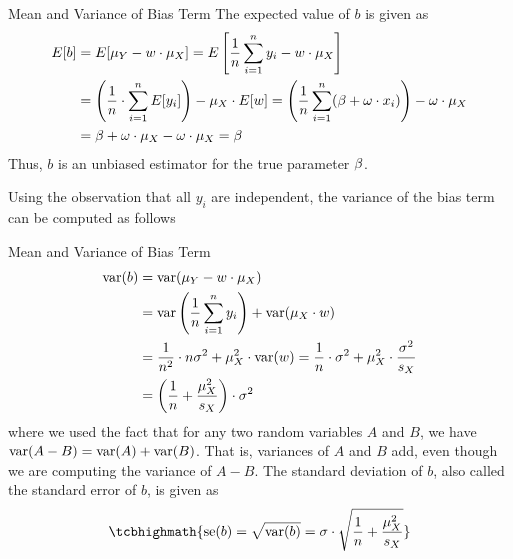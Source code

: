 \begin{frame}{Mean and Variance of Bias Term}
The expected value of $b$ is given as
\begin{align*}
    E[b] & = E[ \mu_Y - w \cdot \mu_X]
    = E\left[ \frac{1}{n} \sum^{n}_{i=1} y_i - w \cdot \mu_X \right]\\
    & = \left(\frac{1}{n} \cdot \sum_{i=1}^n E[ y_{i} ]\right) - \mu_X \cdot E[w]
    = \left(\frac{1}{n} \sum^{n}_{i=1} (\beta + \omega \cdot x_i)\right) 
    - \omega \cdot \mu_X\\
    & = \beta + \omega \cdot \mu_X - \omega \cdot \mu_X = \beta
\end{align*}
Thus, $b$ is an unbiased estimator for the true parameter $\beta$.

Using the observation that all $y_i$ are independent, 
the variance of the bias term can be computed as follows
\end{frame}
%
\begin{frame}{Mean and Variance of Bias Term}
\begin{align*}
    \operatorname{var}(b) & = \operatorname{var}(\mu_Y - w \cdot \mu_X)\\
    & = \operatorname{var}\left( \frac{1}{n} \sum^{n}_{i=1} y_i \right) +
    \operatorname{var}(\mu_X \cdot w)\\
   &  = \frac{1}{n^2} \cdot n \sigma^2 + \mu_X^2 \cdot \operatorname{var}(w)
    = \frac{1}{n} \cdot \sigma^2 + \mu_X^2 \cdot \frac{\sigma^2}{s_X}\\
  & = \left(\frac{1}{n} + \frac{\mu_X^2}{s_X}\right) \cdot \sigma^2 
\end{align*}
where we used the
fact that for any two random variables $A$ and $B$, we have $\operatorname{var}(A-B) =
\operatorname{var}(A)+\operatorname{var}(B)$. That is, variances of $A$ and $B$ add, even though we
are computing the variance of $A-B$.
The standard deviation of $b$, also called the standard error of
$b$, is given as
\begin{align}
    \tcbhighmath{
    \se(b) = \sqrt{\var(b)} 
= \sigma \cdot \sqrt{\frac{1}{n} + \frac{\mu_X^2}{s_X}}}
\end{align}
\end{frame}

